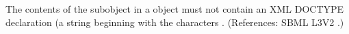 The contents of the \Message subobject in a \Constraint object must not
contain an XML DOCTYPE declaration (\ie a string beginning with the
characters .  (References: SBML L3V2
.)
